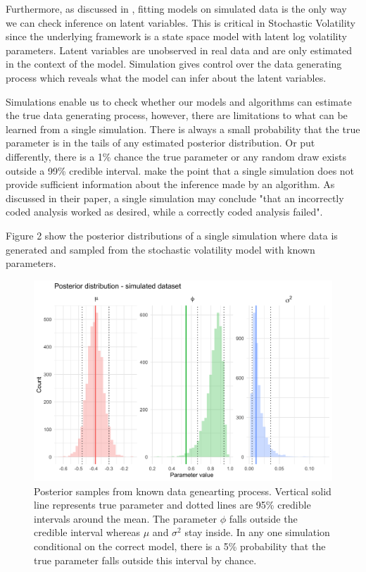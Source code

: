 \documentclass[12pt, a4paper]{article}
\begin{document}
    Furthermore, as discussed in \citet{gelman2020bayesian}, fitting models on simulated data is the only way we can check inference on latent variables. This is critical in Stochastic Volatility since the underlying framework is a state space model with latent log volatility parameters. Latent variables are unobserved in real data and are only estimated in the context of the model. Simulation gives control over the data generating process which reveals what the model can infer about the latent variables. 

    Simulations enable us to check whether our models and algorithms can estimate the true data generating process, however, there are limitations to what can be learned from a single simulation. There is always a small probability that the true parameter is in the tails of any estimated posterior distribution. Or put differently, there is a 1\% chance the true parameter or any random draw exists outside a 99\% credible interval. \cite{talts2018validating} make the point that a single simulation does not provide sufficient information about the inference made by an algorithm. As discussed in their paper, a single simulation may conclude "that an incorrectly coded analysis worked as desired, while a correctly coded analysis failed". 

    Figure 2 show the posterior distributions of a single simulation where data is generated and sampled from the stochastic volatility model with known parameters.

    \begin{figure}[h]
        \centering
        \includegraphics[scale=0.1]{motivating_example/single_sim.png}
        \caption{Posterior samples from known data genearting process. Vertical solid line represents true parameter and dotted lines are 95\% credible intervals around the mean. The parameter $\phi$ falls outside the credible interval whereas $\mu$ and $\sigma^2$ stay inside. In any one simulation conditional on the correct model, there is a 5\% probability that the true parameter falls outside this interval by chance.}
    \end{figure}
\end{document}
